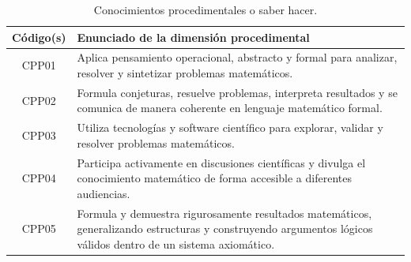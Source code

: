 \documentclass[11pt,a4paper]{article}
\begin{document}
\begin{table}[H]
\centering
\renewcommand{\arraystretch}{1.3}
\begin{tabular}{|c|p{9cm}|}
\hline
\cellcolor[HTML]{00C0F3}\textbf{Código(s)}  & \cellcolor[HTML]{00C0F3}\textbf{Enunciado de la dimensión procedimental} \\
\hline
CPP01 & Aplica pensamiento operacional, abstracto y formal para analizar, resolver y sintetizar problemas matemáticos. \\
\hline
CPP02 & Formula conjeturas, resuelve problemas, interpreta resultados y se comunica de manera coherente en lenguaje matemático formal. \\
\hline
CPP03 & Utiliza tecnologías y software científico para explorar, validar y resolver problemas matemáticos.\\
\hline
CPP04 & Participa activamente en discusiones científicas y divulga el conocimiento matemático de forma accesible a diferentes audiencias.\\
\hline
CPP05 & Formula y demuestra rigurosamente resultados matemáticos, generalizando estructuras y construyendo argumentos lógicos válidos dentro de un sistema axiomático.\\
\hline
\end{tabular}
\caption{Conocimientos procedimentales o saber hacer.}
\end{table}
\end{document}
